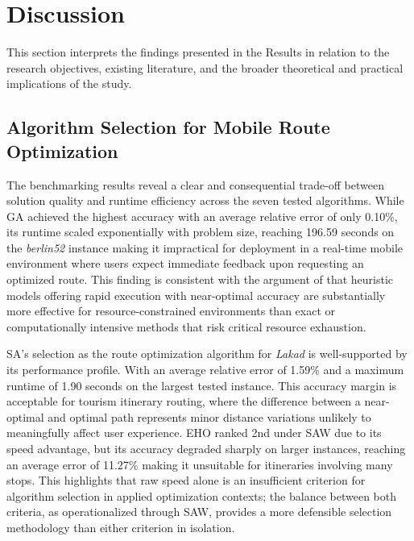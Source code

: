 \section{Discussion}

This section interprets the findings presented in the Results in relation
to the research objectives, existing literature, and the broader
theoretical and practical implications of the study.
 
\subsection{Algorithm Selection for Mobile Route Optimization}
 
The benchmarking results reveal a clear and consequential trade-off
between solution quality and runtime efficiency across the seven tested
algorithms. While GA achieved the highest accuracy with an average
relative error of only 0.10\%, its runtime scaled exponentially with
problem size, reaching 196.59 seconds on the \textit{berlin52} instance making
it impractical for deployment in a real-time mobile environment where
users expect immediate feedback upon requesting an optimized route.
This finding is consistent with the argument of \textcite{Wadi2025} that
heuristic models offering rapid execution with near-optimal accuracy are
substantially more effective for resource-constrained environments than
exact or computationally intensive methods that risk critical resource
exhaustion.
 
SA’s selection as the route optimization algorithm for \textit{Lakad} is
well-supported by its performance profile. With an average relative
error of 1.59\% and a maximum runtime of 1.90 seconds on the largest
tested instance. This accuracy margin is acceptable for tourism itinerary routing, where the difference between a near-optimal and optimal path represents minor distance variations unlikely to meaningfully affect user experience. EHO ranked 2nd under SAW due to its speed advantage, but its accuracy degraded
sharply on larger instances, reaching an average error of 11.27\% making it unsuitable for itineraries involving many stops. This highlights that raw speed alone is an insufficient criterion for algorithm selection in applied optimization contexts; the balance between both criteria, as operationalized through SAW, provides a more defensible selection methodology than either criterion in isolation.
 
